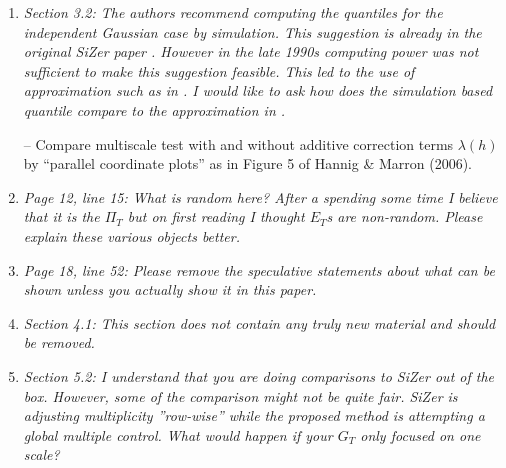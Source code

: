 \documentclass[a4paper,12pt]{article}
\begin{document}
\begin{enumerate}[label=(\arabic*),leftmargin=0.8cm]

\item \textit{Section 3.2: The authors recommend computing the quantiles for the independent Gaussian case by simulation. This suggestion is already in the original SiZer paper \citep{ChaudhuriMarron1999}. However in the late 1990s computing power was not sufficient to make this suggestion feasible. This led to the use of approximation such as in \cite{HannigMarron2006}. I would like to ask how does the simulation based quantile compare to the approximation in \cite{HannigMarron2006}.} 

-- Compare multiscale test with and without additive correction terms $\lambda(h)$ by ``parallel coordinate plots'' as in Figure 5 of Hannig \& Marron (2006). 


\item \textit{Page 12, line 15: What is random here? After a spending some time I believe that it is the $\Pi_T$ but on first reading I thought $E_T$s are non-random. Please explain these various objects better.}


\item \textit{Page 18, line 52: Please remove the speculative statements about what can be shown unless you actually show it in this paper.}


\item \textit{Section 4.1: This section does not contain any truly new material and should be removed.}


\item \textit{Section 5.2: I understand that you are doing comparisons to SiZer out of the box. However, some of the comparison might not be quite fair. SiZer is adjusting multiplicity ”row-wise” while the proposed method is attempting a global multiple control. What would happen if your $G_T$ only focused on one scale?}


\end{enumerate}
\end{document}
